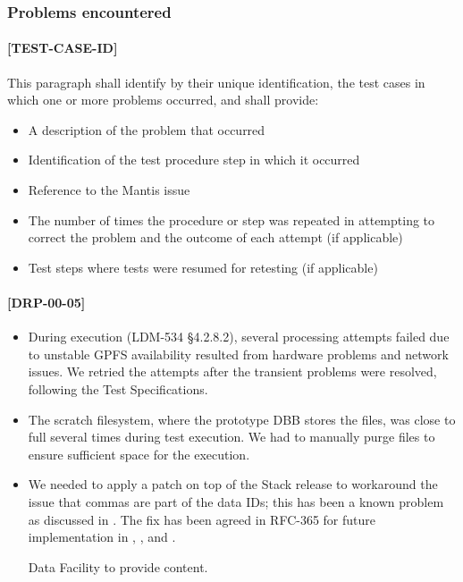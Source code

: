 \documentclass[DM,lsstdraft,STR,toc]{lsstdoc}
\begin{document}
\subsubsection{Problems encountered}
\paragraph{[TEST-CASE-ID]}
This paragraph shall identify by their unique identification, the test cases in which one or more problems occurred, and shall provide:
\begin{itemize}
\item A description of the problem that occurred
\item Identification of the test procedure step in which it occurred
\item Reference to the Mantis issue
\item The number of times the procedure or step was repeated in attempting to correct the problem and the outcome of each attempt (if applicable)
\item Test steps where tests were resumed for retesting (if applicable)
\end{itemize}

\paragraph{[DRP-00-05]}

\begin{itemize}
  \item During execution (LDM-534 \S 4.2.8.2), several processing
	attempts failed due to unstable GPFS availability resulted
	from hardware problems and network issues. We retried the
	attempts after the transient problems were resolved, following
	the Test Specifications.
  \item The scratch filesystem, where the prototype DBB stores the
	files, was close to full several times during test execution.
	We had to manually purge files to ensure sufficient space
	for the execution.
  \item We needed to apply a patch on top of the Stack release to
	workaround the issue that commas are part of the data IDs;
	this has been a known problem as discussed in .
	The fix has been agreed in RFC-365 for future implementation
	in , , and .
\begin{note}
Data Facility to provide content.
\end{note}
\end{itemize}
\end{document}
